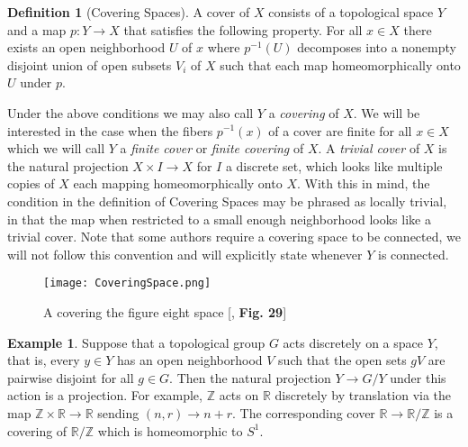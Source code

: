 \documentclass{article}
\theoremstyle{definition}
\newtheorem{definition}[theorem]{Definition}
\newtheorem{example}[theorem]{Example}
\theoremstyle{remark}
\theoremstyle{plain}
\newcommand{\R}{\mathbb{R}}
\newcommand{\Z}{\mathbb{Z}}
\begin{document}
\begin{definition}[Covering Spaces]
A cover of $X$ consists of a topological space $Y$ and a map $p:Y \to X$ that satisfies the following property. 
	For all $x \in X$ there exists an open neighborhood $U$ of $x$ where $p^{-1}(U)$ decomposes into a nonempty disjoint union of open subsets $V_i$ of $X$ such that each map homeomorphically onto $U$ under $p$.
\end{definition}

Under the above conditions we may also call $Y$ a \textit{covering} of $X$.
We will be interested in the case when the fibers $p^{-1}(x)$ of a cover are finite for all $x \in X$ which we will call $Y$ a \textit{finite cover} or \textit{finite covering} of $X$.
A \textit{trivial cover} of $X$ is the natural projection $X \times I \to X$ for $I$ a discrete set, which looks like multiple copies of $X$ each mapping homeomorphically onto $X$.
With this in mind, the condition in the definition of Covering Spaces may be phrased as locally trivial, in that the map when restricted to a small enough neighborhood looks like a trivial cover.
Note that some authors require a covering space to be connected, we will not follow this convention and will explicitly state whenever $Y$ is connected.


\begin{figure}[ht!]
\centering
\texttt{[image: CoveringSpace.png]}

\caption*{A covering the figure eight space [\cite{FomenkoFuchs}, \textbf{Fig. 29}]}
\end{figure}

\begin{example} Suppose that a topological group $G$ acts discretely on a space $Y$, that is, every $y \in Y$ has an open neighborhood $V$ such that the open sets $gV$ are pairwise disjoint for all $g  \in G$.
	Then the natural projection $Y \to G/Y$ under this action is a projection.
	For example, $\Z$ acts on $\R$ discretely by translation via the map $\Z \times \R \to \R$ sending $(n,r) \to n+r$.
	The corresponding cover $\R \to \R/\Z$ is a covering of $\R/\Z$ which is homeomorphic to $S^1$.
\end{example}
\end{document}
